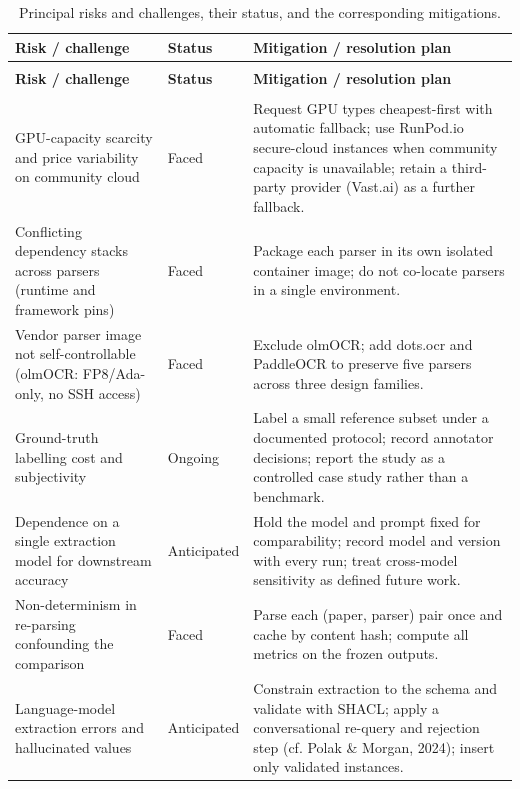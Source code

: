 \documentclass{template}
\begin{document}
{\small
\begin{longtable}{@{}>{\raggedright\arraybackslash}p{3.5cm} >{\raggedright\arraybackslash}p{2.0cm} >{\raggedright\arraybackslash}p{7.4cm}@{}}
\caption{Principal risks and challenges, their status, and the corresponding mitigations.}\label{tab:risks}\\
\toprule
\textbf{Risk / challenge} & \textbf{Status} & \textbf{Mitigation / resolution plan} \\
\midrule
\endfirsthead
\multicolumn{3}{l}{\itshape\small Table 2 (continued)}\\
\toprule
\textbf{Risk / challenge} & \textbf{Status} & \textbf{Mitigation / resolution plan} \\
\midrule
\endhead
\midrule
\multicolumn{3}{r}{\itshape\small continued on next page}\\
\endfoot
\bottomrule
\endlastfoot
GPU-capacity scarcity and price variability on community cloud & Faced & Request GPU types cheapest-first with automatic fallback; use RunPod.io secure-cloud instances when community capacity is unavailable; retain a third-party provider (Vast.ai) as a further fallback. \\
\addlinespace
Conflicting dependency stacks across parsers (runtime and framework pins) & Faced & Package each parser in its own isolated container image; do not co-locate parsers in a single environment. \\
\addlinespace
Vendor parser image not self-controllable (olmOCR: FP8/Ada-only, no SSH access) & Faced & Exclude olmOCR; add dots.ocr and PaddleOCR to preserve five parsers across three design families. \\
\addlinespace
Ground-truth labelling cost and subjectivity & Ongoing & Label a small reference subset under a documented protocol; record annotator decisions; report the study as a controlled case study rather than a benchmark. \\
\addlinespace
Dependence on a single extraction model for downstream accuracy & Anticipated & Hold the model and prompt fixed for comparability; record model and version with every run; treat cross-model sensitivity as defined future work. \\
\addlinespace
Non-determinism in re-parsing confounding the comparison & Faced & Parse each (paper, parser) pair once and cache by content hash; compute all metrics on the frozen outputs. \\
\addlinespace
Language-model extraction errors and hallucinated values & Anticipated & Constrain extraction to the schema and validate with SHACL; apply a conversational re-query and rejection step (cf. Polak \& Morgan, 2024); insert only validated instances. \\

\end{longtable}}
\end{document}
